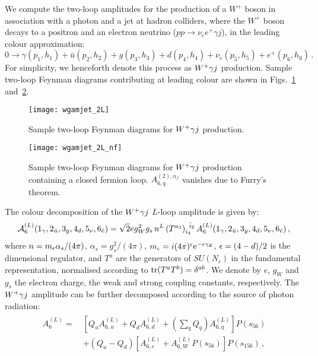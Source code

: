 \documentclass[main.tex]{subfiles}
\begin{document}
We compute the two-loop amplitudes for the production of a $W^+$ boson in association with a photon and a jet at hadron colliders,
where the $W^+$ boson decays to a positron and an electron neutrino ($pp \to \nu_e e^+ \gamma j$),
in the leading colour approximation:
%
\begin{equation} \label{Wyjeq:wpaj}
0 \rightarrow \gamma(p_1,h_1)+\bar{u}(p_2,h_2)+g(p_3,h_3)+d(p_4,h_4)+\nu_e(p_5,h_5)+e^+(p_6,h_6) \,.
\end{equation}
%
For simplicity, we henceforth denote this process as $W^+\gamma j$ production. Sample two-loop Feynman diagrams contributing at leading colour are shown in Figs.~\ref{Wyjfig:diag2L} and~\ref{Wyjfig:diag2Lnf}.
%
\begin{figure}[t!]
  \begin{center}
    \texttt{[image: wgamjet\_2L]}
  \end{center}
  \caption{Sample two-loop Feynman diagrams for $W^+\gamma j$ production.}
  \label{Wyjfig:diag2L}
\end{figure}
\begin{figure}[t]
  \begin{center}
    \texttt{[image: wgamjet\_2L\_nf]}
  \end{center}
  \caption{Sample two-loop Feynman diagrams for $W^+\gamma j$ production containing a closed fermion loop. $A_{6,q}^{(2),n_f}$ vanishes due to Furry's theorem.}
  \label{Wyjfig:diag2Lnf}
\end{figure}
%
The colour decomposition of the $W^+\gamma j$ $L$-loop amplitude is given by:
\begin{equation}
\mathcal{A}_{6}^{(L)}(1_\gamma,2_{\bar{u}},3_g,4_d,5_{\nu},6_{\bar{e}}) = \sqrt{2} e g_W^2  g_s \, n^L \, (T^{a_3})_{i_4}^{\;\;\bar i_2} \, A_{6}^{(L)}(1_\gamma,2_{\bar{u}},3_g,4_d,5_{\nu},6_{\bar{e}}) \,,
\label{Wyjeq:colourdecomposition}
\end{equation}
where  $n= m_\epsilon  \alpha_s/(4\pi)$, $\alpha_s = g_s^2/(4\pi)$, $m_\epsilon=i (4\pi)^{\epsilon} \mathrm{e}^{-\epsilon\gamma_E}$, $\epsilon = (4-d)/2$ is the dimensional regulator, and
$T^a$ are the generators of $SU(N_c)$ in the fundamental representation, normalised according to $\operatorname{\rm tr}(T^a T^b) = \delta^{ab}$.
We denote by $e$, $g_W$ and $g_s$ the electron charge, the weak and strong coupling constants, respectively.
The $W^+\gamma j$ amplitude can be further decomposed according to the source of photon radiation:
\begin{align}
\label{Wyjeq:ampdecomposition}
\begin{aligned}
A_{6}^{(L)} = \ & \left[ Q_u A^{(L)}_{6,u} + Q_d A^{(L)}_{6,d} + \left(\sum_{q} Q_q\right) A^{(L)}_{6,q} \right] P(s_{56}) \\
& + \left(Q_u - Q_d\right) \left[ A^{(L)}_{6,e} + A^{(L)}_{6,W} P(s_{56}) \right] P(s_{156}) \,,
\end{aligned}
\end{align}
\end{document}
